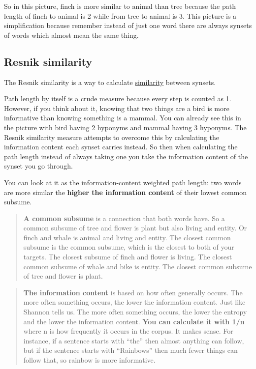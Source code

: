 \documentclass[
  11pt,
  british,
]{article}
\begin{document}
So in this picture, finch is more similar to animal than tree because
the path length of finch to animal is 2 while from tree to animal is 3.
This picture is a simplification because remember instead of just one
word there are always synsets of words which almost mean the same thing.

\hypertarget{resnik-similarity}{%
\subsection{Resnik similarity}\label{resnik-similarity}}

The Resnik similarity is a way to calculate
\href{../Semantic-Similarity/Similarity.md}{similarity} between synsets.

Path length by itself is a crude measure because every step is counted
as 1. However, if you think about it, knowing that two things are a bird
is more informative than knowing something is a mammal. You can already
see this in the picture with bird having 2 hyponyms and mammal having 3
hyponyms. The Resnik similarity measure attempts to overcome this by
calculating the information content each synset carries instead. So then
when calculating the path length instead of always taking one you take
the information content of the synset you go through.

You can look at it as the information-content weighted path length: two
words are more similar the \textbf{higher the information content} of
their lowest common subsume.

\begin{quote}
\textbf{A common subsume} is a connection that both words have. So a
common subsume of tree and flower is plant but also living and entity.
Or finch and whale is animal and living and entity. The closest common
subsume is the common subsume, which is the closest to both of your
targets. The closest subsume of finch and flower is living. The closest
common subsume of whale and bike is entity. The closest common subsume
of tree and flower is plant.
\end{quote}

\begin{quote}
\textbf{The information content} is based on how often generally occurs.
The more often something occurs, the lower the information content. Just
like Shannon tells us. The more often something occurs, the lower the
entropy and the lower the information content. \textbf{You can calculate
it with 1/n} where n is how frequently it occurs in the corpus. It makes
sense. For instance, if a sentence starts with ``the'' then almost
anything can follow, but if the sentence starts with ``Rainbows'' then
much fewer things can follow that, so rainbow is more informative.
\end{quote}
\end{document}
